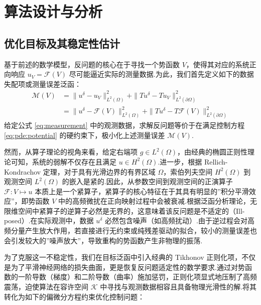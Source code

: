\section{算法设计与分析}\label{sec:tikpinns}
\subsection{优化目标及其稳定性估计}
基于前述的数学模型，反问题的核心在于寻找一个势函数 $V$，使得其对应的系统正向响应 $u_V = \mathcal{F}(V)$ 尽可能逼近实际的测量数据.为此，我们首先定义如下的数据失配项或测量误差泛函：
\begin{equation}\label{eq:data_mismatch}
\begin{aligned}
    \mathcal{M}(V) &= \|u^{\delta}-u_V\|_{L^{2}(\Omega)}^{2}+\|Tu^{\delta}-Tu_V\|_{L^{2}(\partial\Omega)}^{2} \\
    &= \|u^{\delta}-\mathcal{F}(V)\|_{L^{2}(\Omega)}^{2}+\|Tu^{\delta}-T\mathcal{F}(V)\|_{L^{2}(\partial\Omega)}^{2}
\end{aligned}
\end{equation}
给定公式 \eqref{eq:measurement} 中的观测数据，求解反问题等价于在满足控制方程 \eqref{eq:pde:potential} 的硬约束下，极小化上述测量误差 $\mathcal{M}(V)$.

\begin{remark}\label{remark:ill_posedness}
然而，从算子理论的视角来看，给定右端项 $g \in L^2(\Omega)$，由经典的椭圆正则性理论可知，系统的弱解不仅存在且满足 $u \in H^2(\Omega)$.进一步，根据 Rellich-Kondrachov 定理，对于具有光滑边界的有界区域 $\Omega$，索伯列夫空间 $H^2(\Omega)$ 到观测空间 $L^2(\Omega)$ 的嵌入是紧的.因此，从参数空间到观测空间的正演算子 $\mathcal{F}: V \mapsto u$ 本质上是一个紧算子，紧算子的核心特征在于其具有明显的”积分平滑效应”，即势函数 $V$ 中的高频微扰在正向映射过程中会被衰减.根据泛函分析理论，无限维空间中紧算子的逆算子必然是无界的，这意味着该反问题是不适定的（Ill-posed）.在实际观测中，数据 $u^\delta$ 必然包含噪声（如高频扰动）.由于逆过程会对高频分量产生放大作用，若直接进行无约束或纯残差驱动的拟合，较小的测量误差也会引发较大的”噪声放大”，导致重构的势函数产生非物理的振荡.   
\end{remark}

为了克服这一不稳定性，我们在目标泛函中引入经典的 Tikhonov 正则化项，不仅是为了平滑神经网络的损失曲面，更是恢复反问题适定性的数学要求.通过对势函数的一阶导数（梯度）和二阶导数（曲率）施加惩罚，正则化项显式地压制了高频震荡，迫使算法在容许空间 $\mathcal{K}$ 中寻找与观测数据相容且具备物理光滑性的解.将其转化为如下的偏微分方程约束优化控制问题：


